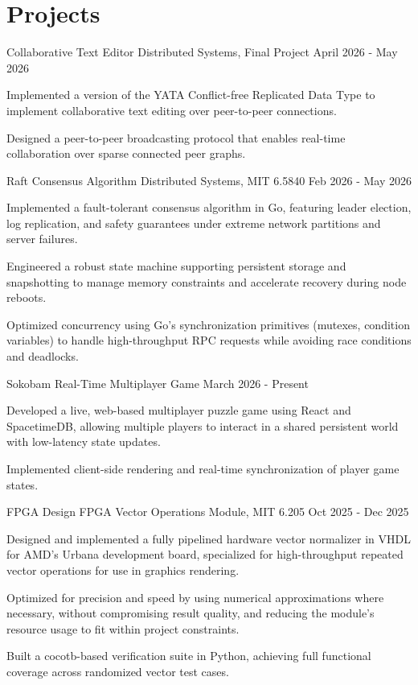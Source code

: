 \section{Projects}
\resumeSubHeadingListStart
\ifdefined\showCRDTProject
\resumeProject
{Collaborative Text Editor}
{Distributed Systems, Final Project}
{April 2026 - May 2026}
{}
\resumeItemListStart
\item[$\bullet$] Implemented a version of the YATA Conflict-free Replicated Data Type to implement collaborative text editing over peer-to-peer connections.
\item[$\bullet$] Designed a peer-to-peer broadcasting protocol that enables real-time collaboration over sparse connected peer graphs.
\resumeItemListEnd
\fi

\ifdefined\showRaftProject
\resumeProject
{Raft Consensus Algorithm}
{Distributed Systems, MIT 6.5840}
{Feb 2026 - May 2026}
{}
\resumeItemListStart
\item[$\bullet$] Implemented a fault-tolerant consensus algorithm in Go, featuring leader election, log replication, and safety guarantees under extreme network partitions and server failures.
\item[$\bullet$] Engineered a robust state machine supporting persistent storage and snapshotting to manage memory constraints and accelerate recovery during node reboots.
\item[$\bullet$] Optimized concurrency using Go’s synchronization primitives (mutexes, condition variables) to handle high-throughput RPC requests while avoiding race conditions and deadlocks.
\resumeItemListEnd
\fi

\ifdefined\showSokobamProject
\resumeProject
{Sokobam {\href{https://github.com/rekomodo/sokobam}{\footnotesize\faExternalLink \hspace{0.1mm}}}}
{Real-Time Multiplayer Game}
{March 2026 - Present}
{}
\resumeItemListStart
\item[$\bullet$] Developed a live, web-based multiplayer puzzle game using React and SpacetimeDB, allowing multiple players to interact in a shared persistent world with low-latency state updates.
\item[$\bullet$] Implemented client-side rendering and real-time synchronization of player game states.
\resumeItemListEnd
\fi

\ifdefined\showFPGAProject
\resumeProject
{FPGA Design}
{FPGA Vector Operations Module, MIT 6.205}
{Oct 2025 - Dec 2025}
{}
\resumeItemListStart
\item[$\bullet$] Designed and implemented a fully pipelined hardware vector normalizer in VHDL for AMD's Urbana development board, specialized for high-throughput repeated vector operations for use in graphics rendering.
\item[$\bullet$] Optimized for precision and speed by using numerical approximations where necessary, without compromising result quality, and reducing the module's resource usage to fit within project constraints.
\item[$\bullet$] Built a cocotb-based verification suite in Python, achieving full functional coverage across randomized vector test cases.
\resumeItemListEnd
\fi
\resumeSubHeadingListEnd
\vspace{-3.5mm}

